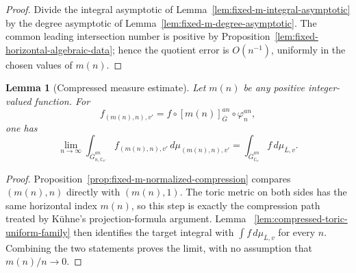 \documentclass[10pt,a4paper]{amsart}
\theoremstyle{plain}
\newtheorem{lemma}[theorem]{Lemma}
\theoremstyle{plain}
\numberwithin{equation}{section}
\providecommand{\ol}{\overline}
\begin{document}
\begin{proof}
	Divide the integral asymptotic of
	Lemma~\ref{lem:fixed-m-integral-asymptotic} by the degree asymptotic of
	Lemma~\ref{lem:fixed-m-degree-asymptotic}.  The common leading intersection
	number is positive by Proposition~\ref{lem:fixed-horizontal-algebraic-data}; hence the
	quotient error is \(O(n^{-1})\), uniformly in the chosen values of \(m(n)\).
\end{proof}

\begin{lemma}[Compressed measure estimate]
	\label{lem:compressed-measure}
	Let \(m(n)\) be any positive integer-valued function.  For
	\[
	f_{(m(n),n),v'}
	=
	f\circ [m(n)]_{\ol G}^{an}\circ\varphi_n^{an},
	\]
	one has
	\[
	\lim_{n\to\infty}
	\int_{\ol G_{n,\mathbb{C}_{v'}}^{an}}
	f_{(m(n),n),v'}\,d\mu_{(m(n),n),v'}
	=
	\int_{\ol G_{\mathbb{C}_v}^{an}}f\,d\mu_{\ol L,v}.
	\]
\end{lemma}

\begin{proof}
	Proposition~\ref{prop:fixed-m-normalized-compression} compares
	\((m(n),n)\) directly with \((m(n),1)\).  The toric metric on both sides has
	the same horizontal index \(m(n)\), so this step is exactly the compression
	path treated by K\"uhne's projection-formula argument.  Lemma
	~\ref{lem:compressed-toric-uniform-family} then identifies the target integral
	with \(\int f\,d\mu_{\ol L,v}\) for every \(n\).  Combining the two statements
	proves the limit, with no assumption that \(m(n)/n\to0\).
\end{proof}
\end{document}
